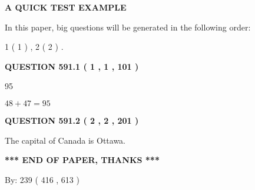 \documentclass[12pt]{article}
\begin{document}
   
\vspace{0.2in}
   
   
   
   
   
   
 \vspace{0.2in}
{\LARGE {\textbf{ A QUICK TEST EXAMPLE}}}
   
   
   
\vspace{0.2in}
   
In this paper, big questions will be generated in the following order: 
   
   
   1 ( 1 )
 ,
   2 ( 2 )
 .
  
\vspace{0.2in}
  
{\textbf{\Large{QUESTION
591.1 
 ( 1 , 1 , 101 )
}}}
  
  
 
 
\noindent{}

95
 
 
 
 
\noindent{}

$ %
48 +  %
47=   %
95$
 
 
  
\vspace{0.2in}
  
{\textbf{\Large{QUESTION
591.2 
 ( 2 , 2 , 201 )
}}}
  
  
 
 
\noindent{}
 
 
The capital of Canada is Ottawa.
 
 
 
 
   
   
 \vspace{0.2in}
 
   
   
   
   
\vspace{1.0in} 
{\textbf{\large{ *** END OF PAPER, THANKS *** }}} 
   
   
\hspace{1.0in} By: 
 239 ( 416 ,  613 )
   
   
   
\end{document}
